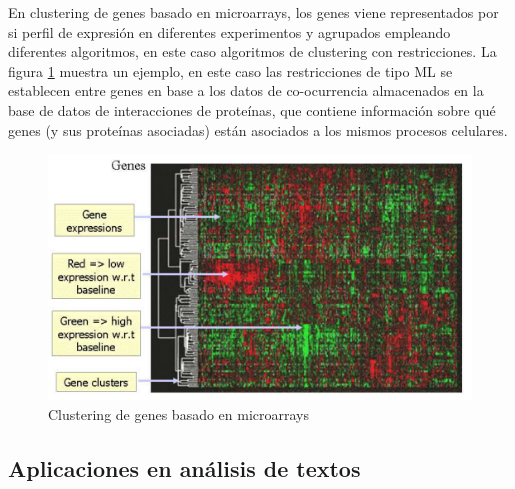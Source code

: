 En clustering de genes basado en microarrays, los genes viene representados por si perfil de expresión en diferentes experimentos y agrupados empleando diferentes algoritmos, en este caso algoritmos de clustering con restricciones. La  figura \ref{fig:figure13} muestra un ejemplo, en este caso las restricciones de tipo \acf{ML} se establecen entre genes en base a los datos de co-ocurrencia almacenados en la base de datos de interacciones de proteínas, que contiene información sobre qué genes (y sus proteínas asociadas) están asociados a los mismos procesos celulares.

\begin{figure}[!h]
	\centering
	\includegraphics[scale=0.3]{imagenes/c3/Genetica/Genes} 
	\caption{Clustering de genes basado en microarrays \cite{Survey:2007}}\label{fig:figure13}
\end{figure}

\subsection{Aplicaciones en análisis de textos}




























